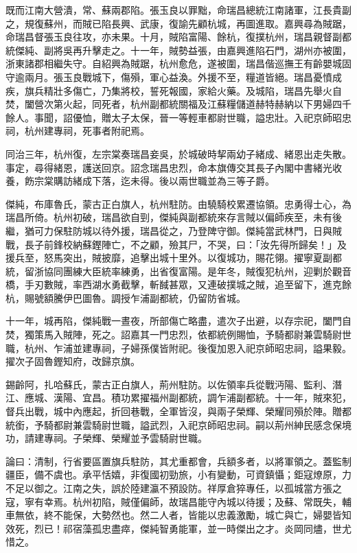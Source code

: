 \begin{pinyinscope}
既而江南大營潰，常、蘇兩郡陷。張玉良以罪黜，命瑞昌總統江南諸軍，江長貴副之，規復蘇州，而賊已陷長興、武康，復諭先顧杭城，再圖進取。嘉興尋為賊踞，命瑞昌督張玉良往攻，亦未果。十月，賊陷富陽、餘杭，復撲杭州，瑞昌親督副都統傑純、副將吳再升擊走之。十一年，賊勢益張，由嘉興進陷石門，湖州亦被圍，浙東諸郡相繼失守。自紹興為賊踞，杭州愈危，遂被圍，瑞昌偕巡撫王有齡嬰城固守逾兩月。張玉良戰城下，傷殞，軍心益渙。外援不至，糧道皆絕。瑞昌憂憤成疾，旗兵精壯多傷亡，乃集將校，誓死報國，家給火藥。及城陷，瑞昌先舉火自焚，闔營次第火起，同死者，杭州副都統關福及江蘇糧儲道赫特赫納以下男婦四千餘人。事聞，詔優恤，贈太子太保，晉一等輕車都尉世職，謚忠壯。入祀京師昭忠祠，杭州建專祠，死事者附祀焉。

同治三年，杭州復，左宗棠奏瑞昌妾吳，於城破時挈兩幼子緒成、緒恩出走失散。事定，尋得緒恩，護送回京。詔念瑞昌忠烈，命本旗傳交其長子內閣中書緒光收養，飭宗棠購訪緒成下落，迄未得。後以兩世職並為三等子爵。

傑純，布庫魯氏，蒙古正白旗人，杭州駐防。由驍騎校累遷協領。忠勇得士心，為瑞昌所倚。杭州初破，瑞昌欲自剄，傑純與副都統來存言賊以偏師疾至，未有後繼，猶可力保駐防城以待外援，瑞昌從之，乃登陴守御。傑純當武林門，日與賊戰，長子前鋒校納蘇鏗陣亡，不之顧，殮其尸，不哭，曰：「汝先得所歸矣！」及援兵至，怒馬突出，賊披靡，追擊出城十里外。以復城功，賜花翎。擢寧夏副都統，留浙協同團練大臣統率練勇，出省復富陽。是年冬，賊復犯杭州，迎剿於觀音橋，手刃數賊，率西湖水勇截擊，斬馘甚眾，又連破撲城之賊，追至留下，進克餘杭，賜號額騰伊巴圖魯。調授乍浦副都統，仍留防省城。

十一年，城再陷，傑純戰一晝夜，所部傷亡略盡，遣次子出避，以存宗祀，闔門自焚，獨策馬入賊陣，死之。詔嘉其一門忠烈，依都統例賜恤，予騎都尉兼雲騎尉世職，杭州、乍浦並建專祠，子婦孫僕皆附祀。後復加恩入祀京師昭忠祠，謚果毅。擢次子固魯鏗知府，改歸京旗。

錫齡阿，扎哈蘇氏，蒙古正白旗人，荊州駐防。以佐領率兵從戰沔陽、監利、潛江、應城、漢陽、宜昌。積功累擢福州副都統，調乍浦副都統。十一年，賊來犯，督兵出戰，城中內應起，折回巷戰，全軍皆沒，與兩子榮輝、榮耀同殞於陣。贈都統銜，予騎都尉兼雲騎尉世職，謚武烈，入祀京師昭忠祠。嗣以荊州紳民感念保境功，請建專祠。子榮輝、榮耀並予雲騎尉世職。

論曰：清制，行省要區置旗兵駐防，其尤重都會，兵額多者，以將軍領之。蓋監制疆臣，備不虞也。承平恬嬉，非復國初勁旅，小有變動，可資鎮懾；鉅寇燎原，力不足以御之。江南之失，誤於陸建瀛不預設防。祥厚倉猝專任，以孤城當方張之寇，寧有幸焉。杭州初陷，賊僅偏師，故瑞昌能守內城以待援；及蘇、常既失，輔車無依，終不能保，大勢然也。然二人者，皆能以忠義激勵，城亡與亡，婦嬰皆知效死，烈已！祁宿藻孤忠盡瘁，傑純智勇能軍，並一時傑出之才。炎岡同燼，世尤惜之。


\end{pinyinscope}
